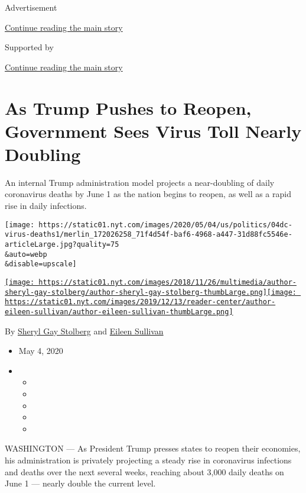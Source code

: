 Advertisement

\protect\hyperlink{after-top}{Continue reading the main story}

Supported by

\protect\hyperlink{after-sponsor}{Continue reading the main story}

\hypertarget{as-trump-pushes-to-reopen-government-sees-virus-toll-nearly-doubling}{%
\section{As Trump Pushes to Reopen, Government Sees Virus Toll Nearly
Doubling}\label{as-trump-pushes-to-reopen-government-sees-virus-toll-nearly-doubling}}

An internal Trump administration model projects a near-doubling of daily
coronavirus deaths by June 1 as the nation begins to reopen, as well as
a rapid rise in daily infections.

\texttt{[image: https://static01.nyt.com/images/2020/05/04/us/politics/04dc-virus-deaths1/merlin\_172026258\_71f4d54f-baf6-4968-a447-31d88fc5546e-articleLarge.jpg?quality=75\\\&auto=webp\\\&disable=upscale]}

\href{https://www.nytimes.com/by/sheryl-gay-stolberg}{\texttt{[image: https://static01.nyt.com/images/2018/11/26/multimedia/author-sheryl-gay-stolberg/author-sheryl-gay-stolberg-thumbLarge.png]}}\href{https://www.nytimes.com/by/eileen-sullivan}{\texttt{[image: https://static01.nyt.com/images/2019/12/13/reader-center/author-eileen-sullivan/author-eileen-sullivan-thumbLarge.png]}}

By \href{https://www.nytimes.com/by/sheryl-gay-stolberg}{Sheryl Gay
Stolberg} and \href{https://www.nytimes.com/by/eileen-sullivan}{Eileen
Sullivan}

\begin{itemize}
\item
  May 4, 2020
\item
  \begin{itemize}
  \item
  \item
  \item
  \item
  \item
  \end{itemize}
\end{itemize}

WASHINGTON --- As President Trump presses states to reopen their
economies, his administration is privately projecting a steady rise in
coronavirus infections and deaths over the next several weeks, reaching
about 3,000 daily deaths on June 1 --- nearly double the current level.

